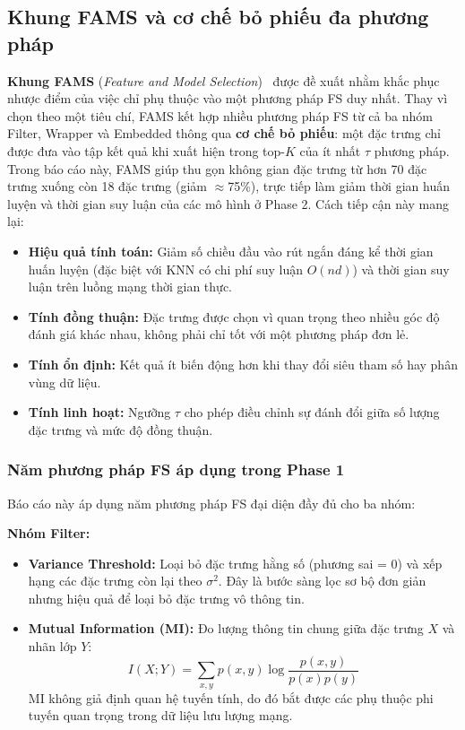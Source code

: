 \subsection{Khung FAMS và cơ chế bỏ phiếu đa phương pháp}

\textbf{Khung FAMS} (\textit{Feature and Model Selection})~\cite{ma2023fams} được đề xuất nhằm khắc phục nhược điểm của việc chỉ phụ thuộc vào một phương pháp FS duy nhất. Thay vì chọn theo một tiêu chí, FAMS kết hợp nhiều phương pháp FS từ cả ba nhóm Filter, Wrapper và Embedded thông qua \textbf{cơ chế bỏ phiếu}: một đặc trưng chỉ được đưa vào tập kết quả khi xuất hiện trong top-$K$ của ít nhất $\tau$ phương pháp. Trong báo cáo này, FAMS giúp thu gọn không gian đặc trưng từ hơn 70 đặc trưng xuống còn 18 đặc trưng (giảm $\approx$75\%), trực tiếp làm giảm thời gian huấn luyện và thời gian suy luận của các mô hình ở Phase 2. Cách tiếp cận này mang lại:

\begin{itemize}
    \item \textbf{Hiệu quả tính toán:} Giảm số chiều đầu vào rút ngắn đáng kể thời gian huấn luyện (đặc biệt với KNN có chi phí suy luận $O(nd)$) và thời gian suy luận trên luồng mạng thời gian thực.
    \item \textbf{Tính đồng thuận:} Đặc trưng được chọn vì quan trọng theo nhiều góc độ đánh giá khác nhau, không phải chỉ tốt với một phương pháp đơn lẻ.
    \item \textbf{Tính ổn định:} Kết quả ít biến động hơn khi thay đổi siêu tham số hay phân vùng dữ liệu.
    \item \textbf{Tính linh hoạt:} Ngưỡng $\tau$ cho phép điều chỉnh sự đánh đổi giữa số lượng đặc trưng và mức độ đồng thuận.
\end{itemize}

\subsubsection{Năm phương pháp FS áp dụng trong Phase 1}

Báo cáo này áp dụng năm phương pháp FS đại diện đầy đủ cho ba nhóm:

\textbf{Nhóm Filter:}
\begin{itemize}
    \item \textbf{Variance Threshold:} Loại bỏ đặc trưng hằng số (phương sai = 0) và xếp hạng các đặc trưng còn lại theo $\sigma^2$. Đây là bước sàng lọc sơ bộ đơn giản nhưng hiệu quả để loại bỏ đặc trưng vô thông tin.
    \item \textbf{Mutual Information (MI):} Đo lượng thông tin chung giữa đặc trưng $X$ và nhãn lớp $Y$:
    \begin{equation}
        I(X;Y) = \sum_{x,y} p(x,y) \log \frac{p(x,y)}{p(x)p(y)}
    \end{equation}
    MI không giả định quan hệ tuyến tính, do đó bắt được các phụ thuộc phi tuyến quan trọng trong dữ liệu lưu lượng mạng.
\end{itemize}

